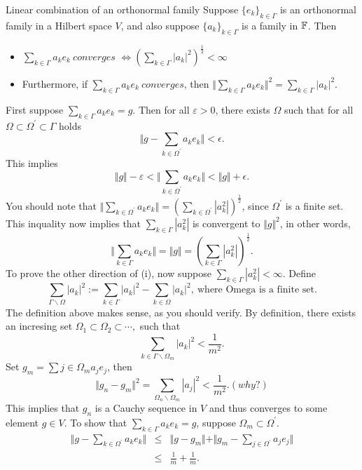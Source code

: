 \begin{stheorem}{Linear combination of an orthonormal family}
Suppose $\{e_k\}_{k \in \Gamma}$ is an orthonormal family in a Hilbert space $V$, and also suppose $\{a_k\}_{k \in \Gamma}$ is a family in $\mathbb{F}$. Then
\begin{itemize}
	\item $\sum_{k \in \Gamma}a_ke_k \ converges$ $\iff (\sum_{k \in \Gamma}|a_k|^2)^{\frac{1}{2}}<\infty$ 
	\item Furthermore, if $\sum_{k \in \Gamma}a_ke_k \ converges$, then $\Vert \sum_{k \in \Gamma}a_ke_k\Vert^2=\sum_{k \in \Gamma}|a_k|^2$.
\end{itemize} 
\end{stheorem}
\begin{Proof}
First suppose $\sum_{k \in \Gamma}a_ke_k=g$. Then for all $\varepsilon > 0$, there exists $\Omega$ such that for all $\Omega \subset \Omega^\prime\subset \Gamma$ holds
$$
\Vert g - \sum_{k\in \Omega^\prime}a_ke_k\Vert < \epsilon.
$$
This implies 
$$
\Vert g \Vert - \varepsilon < \Vert \sum_{k \in \Omega^\prime}a_ke_k\Vert < \Vert g\Vert + \epsilon.
$$
You should note that $\Vert \sum_{k \in \Omega^\prime}a_ke_k\Vert=(\sum_{k\in \Omega^\prime}|a_k^2|)^{\frac{1}{2}}$, since $\Omega^\prime$ is a finite set. This inquality now implies that $\sum_{k\in \Gamma}|a_k^2|$ is convergent to $\Vert g \Vert^2$, in other words,
$$
\Vert \sum_{k \in \Gamma} a_ke_k \Vert = \Vert g\Vert= (\sum_{k\in \Gamma}|a_k^2|)^\frac{1}{2}.
$$
To prove the other direction of (i), now suppose $\sum_{k\in \Gamma}|a_k^2|<\infty$. Define
$$
\sum_{\Gamma \backslash \Omega}|a_k|^2 := \sum_{k \in \Gamma}|a_k|^2 - \sum_{k \in \Omega}|a_k|^2, \ \text{where Omega is a finite set.}
$$
The definition above makes sense, as you should verify. By definition, there exists an incresing set $\Omega_1\subset \Omega_2 \subset \cdots,$ such that 
$$
\sum_{k \in \Gamma \backslash \Omega_m} |a_k|^2 < \frac{1}{m^2}.
$$
Set $g_m = \sum{j\in \Omega_m}a_je_j$, then
$$
\Vert g_n -g_m \Vert ^2 = \sum_{\Omega_n \backslash \Omega_m}|a_j|^2<\frac{1}{m^2}.(why?)
$$
This implies that $g_n$ is a Cauchy sequence in $V$ and thus converges to some element $g \in V$. To show that $\sum_{k \in \Gamma}a_ke_k=g$, suppose $\Omega_m \subset \Omega^\prime $.
\begin{eqnarray*}
	\Vert g - \sum_{k \in \Omega^\prime}a_ke_k\Vert &\leq& \Vert g-g_m\Vert + \Vert g_m-\sum_{j \in \Omega^\prime}a_je_j \Vert \\
	&\leq & \frac{1}{m} + \frac{1}{m}.
\end{eqnarray*}
\end{Proof}


